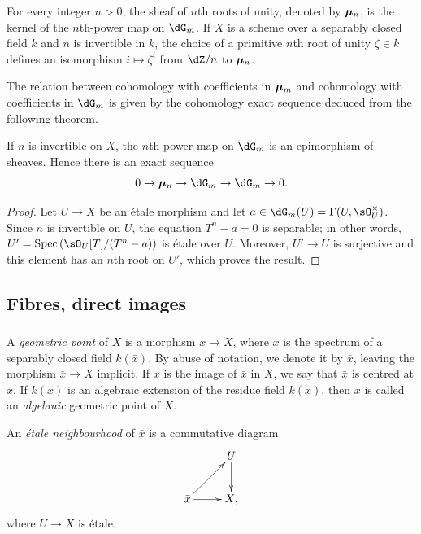For every integer $n>0$, the sheaf of $n$th roots of unity, denoted by
${\bm\mu}_n$, is the kernel of the $n$th-power map on $\dG_m$.
If $X$ is a scheme over a separably closed field $k$ and $n$ is
invertible in $k$, the choice of a primitive $n$th root of unity
$\zeta\in k$ defines an isomorphism $i\mapsto\zeta^i$ from $\dZ/n$ to
${\bm\mu}_n$.

The relation between cohomology with coefficients in ${\bm\mu}_m$ and
cohomology with coefficients in $\dG_m$ is given by the cohomology exact
sequence deduced from the following theorem.

\begin{theorem}\label{I:2-2-5}
If $n$ is invertible on $X$, the $n$th-power map on $\dG_m$ is an
epimorphism of sheaves. Hence there is an exact sequence
\[
  0 \to \dmu_n \to \dG_m \to \dG_m \to 0\text{.}
\]
\end{theorem}
\begin{proof}
Let $U\to X$ be an étale morphism and let
$a\in\dG_m(U)=\Gamma(U,\sO_U^\times)$. Since $n$ is invertible on $U$,
the equation $T^n-a=0$ is separable; in other words,
$U'=\spec\left(\sO_U[T]/(T^n-a)\right)$ is étale over $U$. Moreover,
$U'\to U$ is surjective and this element has an $n$th root on $U'$, which proves
the result.
\end{proof}

\subsection{Fibres, direct images}\label{I:2-3}

\subsubsection{}\label{I:2-3-1}

A \emph{geometric point} of $X$ is a morphism $\bar x\to X$, where
$\bar x$ is the spectrum of a separably closed field $k(\bar x)$. By
abuse of notation, we denote it by $\bar x$, leaving the morphism
$\bar x\to X$ implicit. If $x$ is the image of $\bar x$ in $X$, we say
that $\bar x$ is centred at $x$. If $k(\bar x)$ is an algebraic extension
of the residue field $k(x)$, then $\bar x$ is called an
\emph{algebraic} geometric point of $X$.

An \emph{étale neighbourhood} of $\bar x$ is a commutative diagram
\[\xymatrix{
  & U \ar[d] \\
  \bar x \ar[ur] \ar[r]
  & X\text{,}
}\]
where $U\to X$ is étale.

